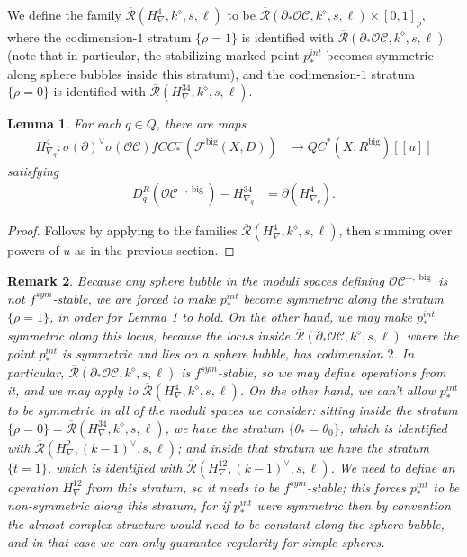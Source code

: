 \documentclass{article}
\newtheorem{lem}{Lemma}[section]
\newtheorem{rem}[lem]{Remark}
\def\fuk{\EuF}
\def\cO{\mathcal{O}}
\def\cC{\mathcal{C}}
\def\fuk{\mathcal{F}}
\def\Rbar{\overline{\mathcal{R}}}
\def\big{{\operatorname{big}}}
\begin{document}
We define the family $\Rbar(H^4_\nabla,k^\diamond,s,\ell)$ to be $\Rbar(\partial_*\cO\cC,k^\diamond,s,\ell) \times [0,1]_\rho$, where the codimension-$1$ stratum $\{\rho=1\}$ is identified with $\Rbar(\partial_*\cO\cC,k^\diamond,s,\ell)$ (note that in particular, the stabilizing marked point $p_*^{int}$ becomes symmetric along sphere bubbles inside this stratum), and the codimension-$1$ stratum $\{\rho=0\}$ is identified with $\Rbar(H^{34}_\nabla,k^\diamond,s,\ell)$. 

\begin{lem}\label{lem:conn 4}
    For each $q \in Q$, there are maps
    \begin{align*}
        H^4_{\nabla_q}:\sigma(\partial)^\vee \sigma(\cO\cC) fCC_*^-(\fuk^\big(X,D)) & \to QC^*(X;R^\big)[[u]]
    \end{align*}
    satisfying
    \begin{align}\label{eq:H4 nab}
         D_q^R(\cO\cC^{-,\big}) - H^{34}_{\nabla_q} &= \partial(H^4_{\nabla_q}).
    \end{align}
\end{lem}
\begin{proof}
    Follows by applying \cite[Lemma 4.18]{relfukii} to the families $\Rbar(H^4_\nabla,k^\diamond,s,\ell)$, then summing over powers of $u$ as in the previous section. 
\end{proof}

\begin{rem}    
Because any sphere bubble in the moduli spaces defining $\cO\cC^{-,\big}$ is not $f^{sym}$-stable, we are forced to make $p_*^{int}$ become symmetric along the stratum $\{\rho=1\}$, in order for Lemma \ref{lem:conn 4} to hold.   
On the other hand, we \emph{may} make $p_*^{int}$ symmetric along this locus, because the locus inside $\Rbar(\partial_*\cO\cC,k^\diamond,s,\ell)$ where the point $p_*^{int}$ is symmetric and lies on a sphere bubble, has codimension $2$. 
In particular, $\Rbar(\partial_*\cO\cC,k^\diamond,s,\ell)$ is $f^{sym}$-stable, so we may define operations from it, and we may apply \cite[Lemma 4.18]{relfukii} to $\Rbar(H^4_\nabla,k^\diamond,s,\ell)$. 
On the other hand, we can't allow $p_*^{int}$ to be symmetric in all of the moduli spaces we consider: sitting inside the stratum $\{\rho = 0\} = \Rbar(H^{34}_\nabla,k^\diamond,s,\ell)$, we have the stratum $\{\theta_* = \theta_0\}$, which is identified with $\Rbar(H^2_\nabla,(k-1)^\vee,s,\ell)$; and inside that stratum we have the stratum $\{t=1\}$, which is identified with $\Rbar(H^{12}_\nabla,(k-1)^\vee,s,\ell)$. 
We need to define an operation $H^{12}_\nabla$ from this stratum, so it needs to be $f^{sym}$-stable; this forces $p_*^{int}$ to be non-symmetric along this stratum, for if $p_*^{int}$ were symmetric then by convention the almost-complex structure would need to be constant along the sphere bubble, and in that case we can only guarantee regularity for simple spheres.
\end{rem}
\end{document}
